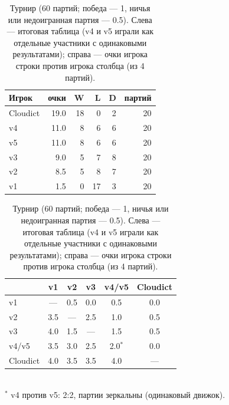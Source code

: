\documentclass[a4paper,10pt,twocolumn]{article}
\begin{document}
\begin{table}[t]
\centering
\caption{Турнир (60 партий; победа --- 1, ничья или недоигранная партия --- 0.5). Слева --- итоговая таблица (v4 и v5 играли как отдельные участники с одинаковыми результатами); справа --- очки игрока строки против игрока столбца (из 4 партий).}
\label{tab:tournament}
\begin{minipage}[t]{0.42\textwidth}\centering
\begin{tabular}{@{}lrrrrr@{}}
\toprule
Игрок & очки & W & L & D & партий \\
\midrule
Cloudict & 19.0 & 18 & 0 & 2 & 20 \\
v4 & 11.0 & 8 & 6 & 6 & 20 \\
v5 & 11.0 & 8 & 6 & 6 & 20 \\
v3 & 9.0 & 5 & 7 & 8 & 20 \\
v2 & 8.5 & 5 & 8 & 7 & 20 \\
v1 & 1.5 & 0 & 17 & 3 & 20 \\
\bottomrule
\end{tabular}
\end{minipage}\hfill
\begin{minipage}[t]{0.54\textwidth}\centering
\begin{tabular}{@{}lccccc@{}}
\toprule
& v1 & v2 & v3 & v4/v5 & Cloudict \\
\midrule
v1 & --- & 0.5 & 0.0 & 0.5 & 0.0 \\
v2 & 3.5 & --- & 2.5 & 1.0 & 0.5 \\
v3 & 4.0 & 1.5 & --- & 1.5 & 0.5 \\
v4/v5 & 3.5 & 3.0 & 2.5 & 2.0$^{*}$ & 0.0 \\
Cloudict & 4.0 & 3.5 & 3.5 & 4.0 & --- \\
\bottomrule
\end{tabular}\\[2pt]
{\footnotesize $^{*}$ v4 против v5: 2:2, партии зеркальны (одинаковый движок).}
\end{minipage}
\end{table}
\end{document}
